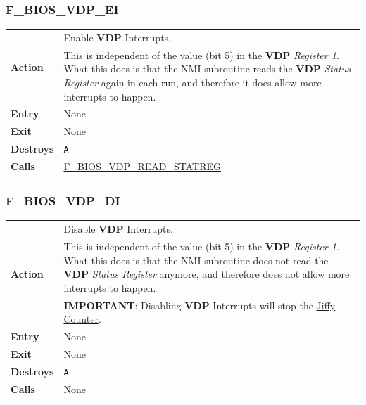\documentclass[a4paper,11pt]{article}
\begin{document}
        \subsubsection{F\_BIOS\_VDP\_EI}
        \label{func:fbiosvdpei}
        \begin{tabular}{l p{9cm}}
            \hline\multirow[t]{2}{4em}{\textbf{Action}}& Enable \textbf{VDP}
            Interrupts.\\
            & This is independent of the value (bit 5) in the \textbf{VDP}
            \textit{Register 1}. What this does is that the NMI subroutine reads
            the \textbf{VDP} \textit{Status Register} again in each run, and
            therefore it does allow more interrupts to happen.\\
            \hline\textbf{Entry} & None\\
            \hline\textbf{Exit} & None\\
            \hline\textbf{Destroys} & \texttt{A}\\
            \hline\textbf{Calls} & \hyperref[func:fbiosvdpreadstatreg]
            {F\_BIOS\_VDP\_READ\_STATREG}\\
            \hline
        \end{tabular}

        \subsubsection{F\_BIOS\_VDP\_DI}
        \label{func:fbiosvdpdi}
        \begin{tabular}{l p{9cm}}
            \hline\multirow[t]{3}{4em}{\textbf{Action}}& Disable \textbf{VDP}
            Interrupts.\\
            & This is independent of the value (bit 5) in the \textbf{VDP}
            \textit{Register 1}. What this does is that the NMI subroutine does
            not read the \textbf{VDP} \textit{Status Register} anymore, and
            therefore does not allow more interrupts to happen.\\
            & \textbf{IMPORTANT}: Disabling \textbf{VDP} Interrupts will stop
            the \hyperref[subsec:jiffy_counter]{Jiffy Counter}.\\
            \hline\textbf{Entry} & None\\
            \hline\textbf{Exit} & None\\
            \hline\textbf{Destroys} & \texttt{A}\\
            \hline\textbf{Calls} & None\\
            \hline
        \end{tabular}
\end{document}
